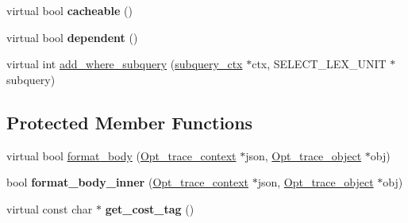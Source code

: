 \begin{DoxyCompactItemize}
\item 
\mbox{\label{classopt__explain__json__namespace_1_1join__ctx_a09d15665daaee308d7d18598badd9d24}} 
virtual bool {\bfseries cacheable} ()
\item 
\mbox{\label{classopt__explain__json__namespace_1_1join__ctx_a050cdd9a2044050749692008ca0e7464}} 
virtual bool {\bfseries dependent} ()
\item 
virtual int \mbox{\hyperlink{classopt__explain__json__namespace_1_1join__ctx_a6d8ebc9b02d479b1b93d2a55b1e1f5ef}{add\+\_\+where\+\_\+subquery}} (\mbox{\hyperlink{classopt__explain__json__namespace_1_1subquery__ctx}{subquery\+\_\+ctx}} $\ast$ctx, S\+E\+L\+E\+C\+T\+\_\+\+L\+E\+X\+\_\+\+U\+N\+IT $\ast$subquery)
\end{DoxyCompactItemize}
\subsection*{Protected Member Functions}
\begin{DoxyCompactItemize}
\item 
virtual bool \mbox{\hyperlink{classopt__explain__json__namespace_1_1join__ctx_a5893d00aa1ebaa3c0f6d5cd55898f13c}{format\+\_\+body}} (\mbox{\hyperlink{classOpt__trace__context}{Opt\+\_\+trace\+\_\+context}} $\ast$json, \mbox{\hyperlink{classOpt__trace__object}{Opt\+\_\+trace\+\_\+object}} $\ast$obj)
\item 
\mbox{\label{classopt__explain__json__namespace_1_1join__ctx_a0b0a59fc9fbd63812695443a31fbe499}} 
bool {\bfseries format\+\_\+body\+\_\+inner} (\mbox{\hyperlink{classOpt__trace__context}{Opt\+\_\+trace\+\_\+context}} $\ast$json, \mbox{\hyperlink{classOpt__trace__object}{Opt\+\_\+trace\+\_\+object}} $\ast$obj)
\item 
\mbox{\label{classopt__explain__json__namespace_1_1join__ctx_aae44c243209aa6c32abfb895c343220e}} 
virtual const char $\ast$ {\bfseries get\+\_\+cost\+\_\+tag} ()
\end{DoxyCompactItemize}
